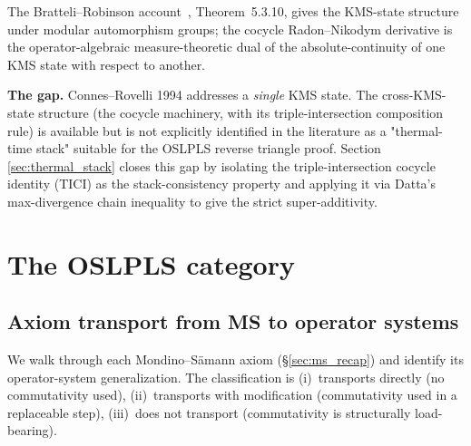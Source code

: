 \documentclass[11pt,a4paper]{article}
\theoremstyle{plain}
\theoremstyle{definition}
\begin{document}
The Bratteli--Robinson account~\cite{bratteli_robinson1981},
Theorem~5.3.10, gives the KMS-state structure under modular
automorphism groups; the cocycle Radon--Nikodym derivative is the
operator-algebraic measure-theoretic dual of the absolute-continuity
of one KMS state with respect to another.

\textbf{The gap.} Connes--Rovelli 1994 addresses a \emph{single} KMS
state. The cross-KMS-state structure (the cocycle machinery, with
its triple-intersection composition rule) is available but is not
explicitly identified in the literature as a "thermal-time stack"
suitable for the OSLPLS reverse triangle proof. Section
\ref{sec:thermal_stack} closes this gap by isolating the
triple-intersection cocycle identity (TICI) as the stack-consistency
property and applying it via Datta's max-divergence chain inequality
to give the strict super-additivity.

\section{The OSLPLS category}\label{sec:oslpls_category}

\subsection{Axiom transport from MS to operator systems}
\label{sec:axiom_transport}

We walk through each Mondino--S\"amann axiom (\S\ref{sec:ms_recap})
and identify its operator-system generalization. The classification is
(i)~transports directly (no commutativity used), (ii)~transports with
modification (commutativity used in a replaceable step),
(iii)~does not transport (commutativity is structurally
load-bearing).
\end{document}
